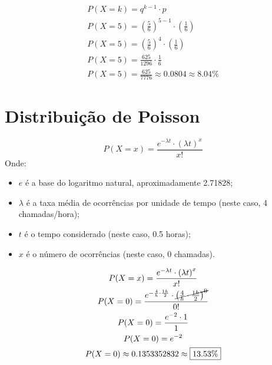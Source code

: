\documentclass{jhwhw}
\begin{document}
\begin{gather*}
	P(X = k) = q^{k-1} \cdot p \\
	P(X = 5) = \left(\frac{5}{6}\right)^{5-1} \cdot \left(\frac{1}{6}\right) \\
	P(X = 5) = \left(\frac{5}{6}\right)^4 \cdot \left(\frac{1}{6}\right) \\
	P(X = 5) = \frac{625}{1296} \cdot \frac{1}{6} \\
	P(X = 5) = \frac{625}{7776} \approx 0.0804 \approx \boxed{8.04\%}
\end{gather*}
\section*{Distribuição de Poisson}
\[
	P(X = x) = \frac{e^{-\lambda t} \cdot \left(\lambda t\right)^x}{x!}
\]
Onde:
\begin{itemize}
	\item $e$ é a base do logaritmo natural, aproximadamente 2.71828;
	\item $\lambda$ é a taxa média de ocorrências por unidade de tempo (neste caso, 4 chamadas/hora);
	\item $t$ é o tempo considerado (neste caso, 0.5 horas);
	\item $x$ é o número de ocorrências (neste caso, 0 chamadas).
\end{itemize}
\begin{gather*}
	P(X = x) = \frac{e^{-\lambda t} \cdot \left(\lambda t\right)^x}{x!}\\
	P(X = 0) = \frac{e^{-\frac{4}{h} \cdot \frac{1h}{2}} \cdot \cancel{\left(\frac{4}{h} \cdot \frac{1h}{2}\right)^0}}{0!}  \\
	P(X = 0) = \frac{e^{-2} \cdot 1}{1} \\
	P(X = 0) = e^{-2} \\
	P(X = 0) \approx 0.1353352832 \approx \boxed{13.53\%}
\end{gather*}
\end{document}
